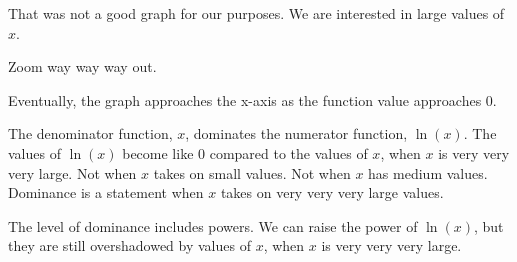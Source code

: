 \documentclass{ximera}
\begin{document}
\begin{example}
That was not a good graph for our purposes.  We are interested in large values of $x$.


Zoom way way way out.






\begin{image}
\end{image}






Eventually, the graph approaches the x-axis as the function value approaches $0$. 


The denominator function, $x$, dominates the numerator function, $\ln(x)$.   The values of $\ln(x)$ become like $0$ compared to the values of $x$, when $x$ is very very very large. Not when $x$ takes on small values.  Not when $x$ has medium values.  Dominance is a statement when $x$ takes on very very very large values.




\end{example}







The level of dominance includes powers.  We can raise the power of $\ln(x)$, but they are still overshadowed by values of $x$, when $x$ is very very very large. 
\end{document}
